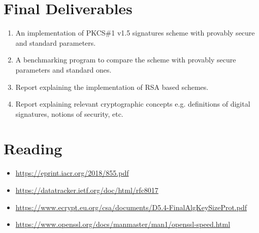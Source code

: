 \documentclass[]{final_report}
\theoremstyle{definition}
\begin{document}
{\section*{Final Deliverables}
\begin{enumerate}
    \item An implementation of PKCS\#1 v1.5 signatures scheme with provably secure and standard parameters.
    \item A benchmarking program to compare the scheme with provably secure parameters and standard ones.
    \item Report explaining the implementation of RSA based schemes.
    \item Report explaining relevant cryptographic concepts e.g. definitions of digital signatures, notions of security, etc.
\end{enumerate}

\section*{Reading}
\begin{itemize}
    \item \href{https://eprint.iacr.org/2018/855.pdf}{https://eprint.iacr.org/2018/855.pdf}
    \item \href{https://datatracker.ietf.org/doc/html/rfc8017}{https://datatracker.ietf.org/doc/html/rfc8017}
    \item \href{https://www.ecrypt.eu.org/csa/documents/D5.4-FinalAlgKeySizeProt.pdf}{https://www.ecrypt.eu.org/csa/documents/D5.4-FinalAlgKeySizeProt.pdf}
    \item \href{https://www.openssl.org/docs/manmaster/man1/openssl-speed.html}{https://www.openssl.org/docs/manmaster/man1/openssl-speed.html}
\end{itemize}
}


\end{document}
